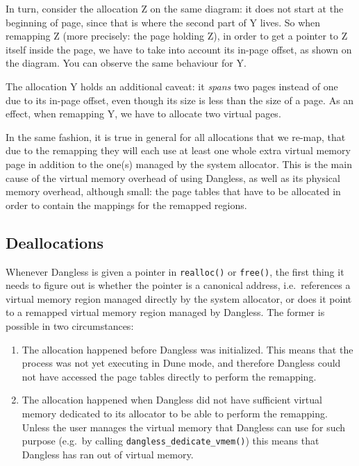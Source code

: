 In turn, consider the allocation Z on the same diagram: it does not start at the beginning of page, since that is where the second part of Y lives. So when remapping Z (more precisely: the page holding Z), in order to get a pointer to Z itself inside the page, we have to take into account its in-page offset, as shown on the diagram. You can observe the same behaviour for Y.

The allocation Y holds an additional caveat: it \emph{spans} two pages instead of one due to its in-page offset, even though its size is less than the size of a page. As an effect, when remapping Y, we have to allocate two virtual pages.

In the same fashion, it is true in general for all allocations that we re-map, that due to the remapping they will each use at least one whole extra virtual memory page in addition to the one(s) managed by the system allocator. This is the main cause of the virtual memory overhead of using Dangless, as well as its physical memory overhead, although small: the page tables that have to be allocated in order to contain the mappings for the remapped regions.

\subsection{Deallocations}
\label{ssec:deallocations}

Whenever Dangless is given a pointer in \lstinline!realloc()! or \lstinline!free()!, the first thing it needs to figure out is whether the pointer is a canonical address, i.e.\ references a virtual memory region managed directly by the system allocator, or does it point to a remapped virtual memory region managed by Dangless. The former is possible in two circumstances:

\begin{enumerate}
	\item The allocation happened before Dangless was initialized. This means that the process was not yet executing in Dune mode, and therefore Dangless could not have accessed the page tables directly to perform the remapping.
	\item The allocation happened when Dangless did not have sufficient virtual memory dedicated to its allocator to be able to perform the remapping. Unless the user manages the virtual memory that Dangless can use for such purpose (e.g.\ by calling \lstinline!dangless_dedicate_vmem()!) this means that Dangless has ran out of virtual memory.
\end{enumerate}

